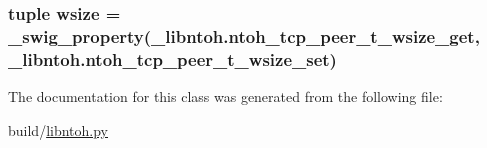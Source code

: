 \hypertarget{classlibntoh_1_1ntoh__tcp__peer__t_a67662bf2129e6e2477a14aa1b8373e65}{
\subsubsection[{wsize}]{\setlength{\rightskip}{0pt plus 5cm}tuple wsize = {\bf \-\_\-swig\-\_\-property}(\-\_\-libntoh.\-ntoh\-\_\-tcp\-\_\-peer\-\_\-t\-\_\-wsize\-\_\-get, \-\_\-libntoh.\-ntoh\-\_\-tcp\-\_\-peer\-\_\-t\-\_\-wsize\-\_\-set)\hspace{0.3cm}{\ttfamily [static]}}}\label{classlibntoh_1_1ntoh__tcp__peer__t_a67662bf2129e6e2477a14aa1b8373e65}


The documentation for this class was generated from the following file\-:\begin{DoxyCompactItemize}
\item 
build/\hyperlink{libntoh_8py}{libntoh.\-py}\end{DoxyCompactItemize}
